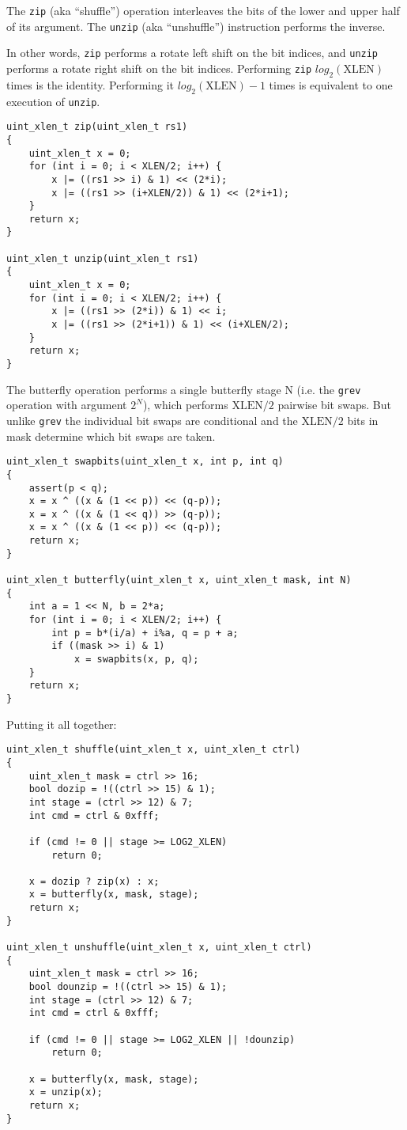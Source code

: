 The \texttt{zip} (aka ``shuffle'') operation interleaves the bits of the lower and upper
half of its argument. The \texttt{unzip} (aka ``unshuffle'') instruction performs the inverse.

In other words, \texttt{zip} performs a rotate left shift on the bit indices,
and \texttt{unzip} performs a rotate right shift on the bit indices.
Performing \texttt{zip} $log_2(\textrm{XLEN})$ times is the identity. Performing it
$log_2(\textrm{XLEN})-1$ times is equivalent to one execution of \texttt{unzip}.

\begin{verbatim}
uint_xlen_t zip(uint_xlen_t rs1)
{
    uint_xlen_t x = 0;
    for (int i = 0; i < XLEN/2; i++) {
        x |= ((rs1 >> i) & 1) << (2*i);
        x |= ((rs1 >> (i+XLEN/2)) & 1) << (2*i+1);
    }
    return x;
}

uint_xlen_t unzip(uint_xlen_t rs1)
{
    uint_xlen_t x = 0;
    for (int i = 0; i < XLEN/2; i++) {
        x |= ((rs1 >> (2*i)) & 1) << i;
        x |= ((rs1 >> (2*i+1)) & 1) << (i+XLEN/2);
    }
    return x;
}
\end{verbatim}

The butterfly operation performs a single butterfly stage N (i.e. the {\tt grev} operation
with argument $2^N$), which performs $\textrm{XLEN}/2$ pairwise bit swaps. But unlike
{\tt grev} the individual bit swaps are conditional and the $\textrm{XLEN}/2$
bits in mask determine which bit swaps are taken.

\begin{verbatim}
uint_xlen_t swapbits(uint_xlen_t x, int p, int q)
{
    assert(p < q);
    x = x ^ ((x & (1 << p)) << (q-p));
    x = x ^ ((x & (1 << q)) >> (q-p));
    x = x ^ ((x & (1 << p)) << (q-p));
    return x;
}

uint_xlen_t butterfly(uint_xlen_t x, uint_xlen_t mask, int N)
{
    int a = 1 << N, b = 2*a;
    for (int i = 0; i < XLEN/2; i++) {
        int p = b*(i/a) + i%a, q = p + a;
        if ((mask >> i) & 1)
            x = swapbits(x, p, q);
    }
    return x;
}
\end{verbatim}

Putting it all together:

\begin{verbatim}
uint_xlen_t shuffle(uint_xlen_t x, uint_xlen_t ctrl)
{
    uint_xlen_t mask = ctrl >> 16;
    bool dozip = !((ctrl >> 15) & 1);
    int stage = (ctrl >> 12) & 7;
    int cmd = ctrl & 0xfff;

    if (cmd != 0 || stage >= LOG2_XLEN)
        return 0;

    x = dozip ? zip(x) : x;
    x = butterfly(x, mask, stage);
    return x;
}

uint_xlen_t unshuffle(uint_xlen_t x, uint_xlen_t ctrl)
{
    uint_xlen_t mask = ctrl >> 16;
    bool dounzip = !((ctrl >> 15) & 1);
    int stage = (ctrl >> 12) & 7;
    int cmd = ctrl & 0xfff;

    if (cmd != 0 || stage >= LOG2_XLEN || !dounzip)
        return 0;

    x = butterfly(x, mask, stage);
    x = unzip(x);
    return x;
}
\end{verbatim}

